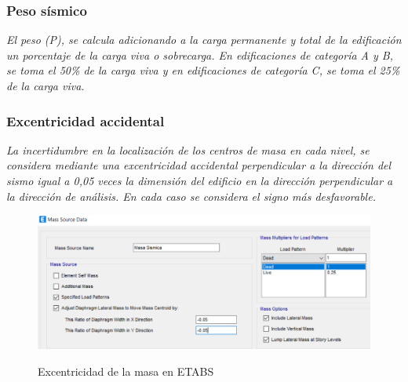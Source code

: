 \documentclass{article}%
\begin{document}
%
\subsubsection{Peso sísmico}%
\label{ssubsec:Pesossmico}%
\begin{tcolorbox}[colback=gray!5!white,colframe=Maroon!75!black,fonttitle=\bfseries,title=Art. 26]%
\textit{El peso (P), se calcula adicionando a la carga permanente y total de la edificación un porcentaje de la carga viva o sobrecarga. En edificaciones de categoría A y B, se toma el 50\% de la carga viva y en edificaciones de categoría C, se toma el 25\% de la carga viva.}%
\end{tcolorbox}%

%
\subsubsection{Excentricidad accidental}%
\label{ssubsec:Excentricidadaccidental}%
\begin{tcolorbox}[colback=gray!5!white,colframe=Maroon!75!black,fonttitle=\bfseries,title=Art. 28.5]%
\textit{La incertidumbre en la localización de los centros de masa en cada nivel, se considera mediante una excentricidad accidental perpendicular a la dirección del sismo igual a 0,05 veces la dimensión del edificio en la dirección perpendicular a la dirección de análisis. En cada caso se considera el signo más desfavorable.}%
\end{tcolorbox}%


\begin{figure}[H]%
\centering%
\caption{Excentricidad de la masa en ETABS}%
\includegraphics[scale=0.7]{images/excentricidad.PNG}%
\label{masa}%
\end{figure}

%
\end{document}
